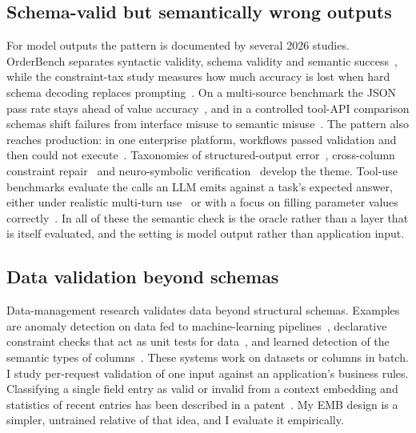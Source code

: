 \documentclass[conference]{IEEEtran}
\begin{document}
\subsection{Schema-valid but semantically wrong outputs}
For model outputs the pattern is documented by several 2026 studies. OrderBench separates syntactic
validity, schema validity and semantic success~\cite{li2026orderbench}, while the constraint-tax study
measures how much accuracy is lost when hard schema decoding replaces
prompting~\cite{ray2026constrainttax}. On a multi-source benchmark the JSON pass rate stays ahead of
value accuracy~\cite{singh2026sob}, and in a controlled tool-API comparison schemas shift failures from
interface misuse to semantic misuse~\cite{sigdel2026schemafirst}. The pattern also reaches production:
in one enterprise platform, workflows passed validation and then could not
execute~\cite{wrenn2026enterprise}. Taxonomies of
structured-output error~\cite{song2026structuredoutput}, cross-column constraint
repair~\cite{zhao2026constraintaware} and neuro-symbolic
verification~\cite{sigloch2026neurosymbolic} develop the theme. Tool-use benchmarks evaluate the calls
an LLM emits against a task's expected answer, either under realistic multi-turn
use~\cite{yu2026wildtoolbench} or with a focus on filling parameter values
correctly~\cite{yu2026parambench}. In all of these the semantic check is the oracle rather than a layer
that is itself evaluated, and the setting is model output rather than application input.

\subsection{Data validation beyond schemas}
Data-management research validates data beyond structural schemas. Examples are anomaly detection on
data fed to machine-learning pipelines~\cite{breck2019datavalidation}, declarative constraint checks
that act as unit tests for data~\cite{schelter2018deequ}, and learned detection of the semantic types
of columns~\cite{hulsebos2019sherlock}. These systems work on datasets or columns in batch. I study
per-request validation of one input against an application's business rules. Classifying a single field
entry as valid or invalid from a context embedding and statistics of recent entries has been described
in a patent~\cite{banerjee2025contextembedding}. My EMB design is a simpler, untrained relative of that
idea, and I evaluate it empirically.
\end{document}
